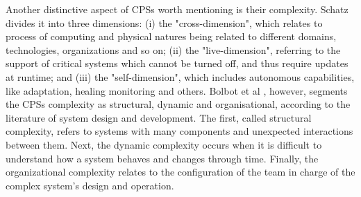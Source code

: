 Another distinctive aspect of CPSs worth mentioning is their complexity. Schatz \cite{schatz2014role} divides it into three dimensions: (i) the "cross-dimension", which relates to process of computing and physical natures being related to different domains, technologies, organizations and so on; (ii) the "live-dimension", referring to the support of critical systems which cannot be turned off, and thus require updates at runtime; and (iii) the "self-dimension", which includes autonomous capabilities, like adaptation, healing monitoring and others. Bolbot et al \cite{bolbot2019vulnerabilities}, however, segments the CPSs complexity as structural, dynamic and organisational, according to the literature of system design and development. The first, called structural complexity, refers to systems with many components and unexpected interactions between them. Next, the dynamic complexity occurs when it is difficult to understand how a system behaves and changes through time. Finally, the organizational complexity relates to the configuration of the team in charge of the complex system's design and operation.



